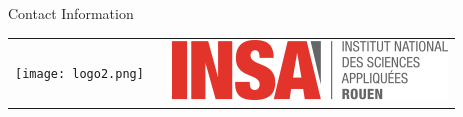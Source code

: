 \documentclass[final]{beamer}
\newlength{\onecolwid}
\begin{document}
\begin{frame}[t]
\begin{columns}[t]
\begin{column}{\onecolwid}
\begin{alertblock}{Contact Information}
\end{alertblock}

\begin{center}
\begin{tabular}{ccc}
\texttt{[image: logo2.png]} & \hfill & \includegraphics[width=0.6\linewidth]{logo.png}
\end{tabular}
\end{center}

\end{column} %

\end{columns}
\end{frame}
\end{document}
